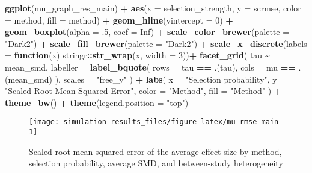 \documentclass[
]{article}
\newenvironment{Shaded}{\begin{snugshade}}{\end{snugshade}}
\newcommand{\AttributeTok}[1]{\textcolor[rgb]{0.13,0.29,0.53}{#1}}
\newcommand{\ConstantTok}[1]{\textcolor[rgb]{0.56,0.35,0.01}{#1}}
\newcommand{\ControlFlowTok}[1]{\textcolor[rgb]{0.13,0.29,0.53}{\textbf{#1}}}
\newcommand{\DecValTok}[1]{\textcolor[rgb]{0.00,0.00,0.81}{#1}}
\newcommand{\FunctionTok}[1]{\textcolor[rgb]{0.13,0.29,0.53}{\textbf{#1}}}
\newcommand{\NormalTok}[1]{#1}
\newcommand{\SpecialCharTok}[1]{\textcolor[rgb]{0.81,0.36,0.00}{\textbf{#1}}}
\newcommand{\StringTok}[1]{\textcolor[rgb]{0.31,0.60,0.02}{#1}}
\begin{document}
\begin{Shaded}
\begin{Highlighting}[]
\FunctionTok{ggplot}\NormalTok{(mu\_graph\_res\_main) }\SpecialCharTok{+} 
  \FunctionTok{aes}\NormalTok{(}\AttributeTok{x =}\NormalTok{ selection\_strength, }\AttributeTok{y =}\NormalTok{ scrmse, }\AttributeTok{color =}\NormalTok{ method, }\AttributeTok{fill =}\NormalTok{ method) }\SpecialCharTok{+}
  \FunctionTok{geom\_hline}\NormalTok{(}\AttributeTok{yintercept =} \DecValTok{0}\NormalTok{) }\SpecialCharTok{+}
  \FunctionTok{geom\_boxplot}\NormalTok{(}\AttributeTok{alpha =}\NormalTok{ .}\DecValTok{5}\NormalTok{, }\AttributeTok{coef =} \ConstantTok{Inf}\NormalTok{) }\SpecialCharTok{+}
  \FunctionTok{scale\_color\_brewer}\NormalTok{(}\AttributeTok{palette =} \StringTok{"Dark2"}\NormalTok{) }\SpecialCharTok{+}
  \FunctionTok{scale\_fill\_brewer}\NormalTok{(}\AttributeTok{palette =} \StringTok{"Dark2"}\NormalTok{) }\SpecialCharTok{+}
  \FunctionTok{scale\_x\_discrete}\NormalTok{(}\AttributeTok{labels =} \ControlFlowTok{function}\NormalTok{(x) stringr}\SpecialCharTok{::}\FunctionTok{str\_wrap}\NormalTok{(x, }\AttributeTok{width =} \DecValTok{3}\NormalTok{))}\SpecialCharTok{+}
  \FunctionTok{facet\_grid}\NormalTok{(}
\NormalTok{    tau }\SpecialCharTok{\textasciitilde{}}\NormalTok{ mean\_smd, }
    \AttributeTok{labeller =} \FunctionTok{label\_bquote}\NormalTok{(}
      \AttributeTok{rows =}\NormalTok{ tau }\SpecialCharTok{==}\NormalTok{ .(tau),}
      \AttributeTok{cols =}\NormalTok{ mu }\SpecialCharTok{==}\NormalTok{ .(mean\_smd)}
\NormalTok{    ),}
    \AttributeTok{scales =} \StringTok{"free\_y"}
\NormalTok{  ) }\SpecialCharTok{+}
  \FunctionTok{labs}\NormalTok{(}
    \AttributeTok{x =} \StringTok{"Selection probability"}\NormalTok{, }
    \AttributeTok{y =} \StringTok{"Scaled Root Mean{-}Squared Error"}\NormalTok{, }
    \AttributeTok{color =} \StringTok{"Method"}\NormalTok{,}
    \AttributeTok{fill =} \StringTok{"Method"}
\NormalTok{  ) }\SpecialCharTok{+} 
  \FunctionTok{theme\_bw}\NormalTok{() }\SpecialCharTok{+}
  \FunctionTok{theme}\NormalTok{(}\AttributeTok{legend.position =} \StringTok{"top"}\NormalTok{)}
\end{Highlighting}
\end{Shaded}

\begin{sidewaysfigure}
\texttt{[image: simulation-results\_files/figure-latex/mu-rmse-main-1]} \caption{Scaled root mean-squared error of the average effect size by method, selection probability, average SMD, and between-study heterogeneity}\label{fig:mu-rmse-main}
\end{sidewaysfigure}
\end{document}
